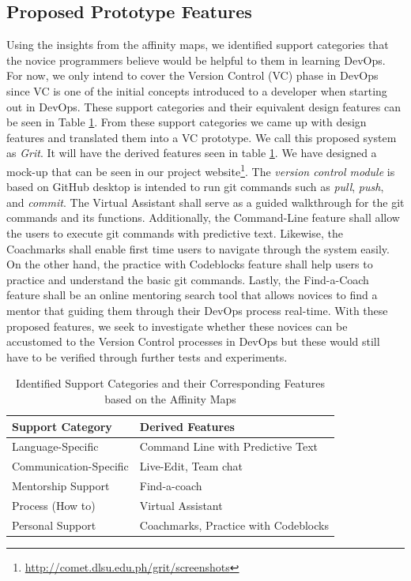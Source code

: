 \documentclass{sigchi}
\begin{document}
\subsection{Proposed Prototype Features}
Using the insights from the affinity maps, we identified support categories that the novice programmers believe would be helpful to them in learning DevOps. For now, we only intend to cover the Version Control (VC) phase in DevOps since VC is one of the initial concepts introduced to a developer when starting out in DevOps\cite{davis2016effective, humble2018accelerate, kim2016devops}. These support categories and their equivalent design features can be seen in Table \ref{ref:tabcategory}. From these support categories we came up with design features and translated them into a VC prototype. We call this proposed system as \textit{Grit}. It will have the derived features seen in table \ref{ref:tabcategory}. We have designed a mock-up that can be seen in our project website\footnote{\url{http://comet.dlsu.edu.ph/grit/screenshots}}. The \textit{version control module} is based on GitHub desktop is intended to run git commands such as \textit{pull}, \textit{push}, and \textit{commit}. The Virtual Assistant shall serve as a guided walkthrough for the git commands and its functions. Additionally, the Command-Line feature shall allow the users to execute git commands with predictive text. Likewise, the Coachmarks shall enable first time users to navigate through the system easily. On the other hand, the practice with Codeblocks feature shall help users to practice and understand the basic git commands. Lastly, the Find-a-Coach feature shall be an online mentoring search tool that allows novices to find a mentor that guiding them through their DevOps process real-time. With these proposed features, we seek to investigate whether these novices can be accustomed to the Version Control processes in DevOps but these would still have to be verified through further tests and experiments. 

\begin{table}[t]
\begin{tabular}{p{} | p{}}
\toprule
\textbf{Support Category}       & \textbf{Derived Features}                     \\ \midrule
Language-Specific      & Command Line with Predictive Text    \\ 
Communication-Specific & Live-Edit, Team chat                 \\
Mentorship Support     & Find-a-coach            \\
Process (How to)       & Virtual Assistant                    \\
Personal Support       & Coachmarks, Practice with Codeblocks \\ \bottomrule
\end{tabular}
\caption{Identified Support Categories and their Corresponding Features based on the Affinity Maps}\label{ref:tabcategory}
\end{table}
\end{document}
